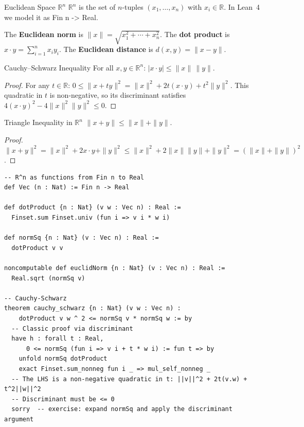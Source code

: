 \documentclass[12pt, openany]{book}
\theoremstyle{plain}
\theoremstyle{definition}
\theoremstyle{remark}
\newcommand{\R}{\mathbb{R}}
\newcommand{\li}[1]{{\ttfamily\small\color{tealaccent}#1}}
\begin{document}
\begin{defbox}{Euclidean Space $\R^n$}
$\R^n$ is the set of $n$-tuples $(x_1, \ldots, x_n)$ with $x_i \in \R$. In Lean~4 we model it as \li{Fin n -> Real}.

The \textbf{Euclidean norm} is $\|x\| = \sqrt{x_1^2 + \cdots + x_n^2}$.
The \textbf{dot product} is $x \cdot y = \sum_{i=1}^n x_i y_i$.
The \textbf{Euclidean distance} is $d(x, y) = \|x - y\|$.
\end{defbox}
\color{black}

\begin{thmbox}{Cauchy--Schwarz Inequality}
For all $x, y \in \R^n$: $|x \cdot y| \leq \|x\|\,\|y\|$.
\end{thmbox}
\color{black}

\begin{proof}
For any $t \in \R$: $0 \leq \|x + ty\|^2 = \|x\|^2 + 2t(x \cdot y) + t^2\|y\|^2$. This quadratic in $t$ is non-negative, so its discriminant satisfies $4(x \cdot y)^2 - 4\|x\|^2\|y\|^2 \leq 0$.
\end{proof}

\begin{thmbox}{Triangle Inequality in $\R^n$}
$\|x + y\| \leq \|x\| + \|y\|$.
\end{thmbox}
\color{black}

\begin{proof}
$\|x+y\|^2 = \|x\|^2 + 2x \cdot y + \|y\|^2 \leq \|x\|^2 + 2\|x\|\|y\| + \|y\|^2 = (\|x\| + \|y\|)^2$.
\end{proof}

\begin{leanbox}
\begin{lstlisting}
-- R^n as functions from Fin n to Real
def Vec (n : Nat) := Fin n -> Real

def dotProduct {n : Nat} (v w : Vec n) : Real :=
  Finset.sum Finset.univ (fun i => v i * w i)

def normSq {n : Nat} (v : Vec n) : Real :=
  dotProduct v v

noncomputable def euclidNorm {n : Nat} (v : Vec n) : Real :=
  Real.sqrt (normSq v)

-- Cauchy-Schwarz
theorem cauchy_schwarz {n : Nat} (v w : Vec n) :
    dotProduct v w ^ 2 <= normSq v * normSq w := by
  -- Classic proof via discriminant
  have h : forall t : Real,
      0 <= normSq (fun i => v i + t * w i) := fun t => by
    unfold normSq dotProduct
    exact Finset.sum_nonneg fun i _ => mul_self_nonneg _
  -- The LHS is a non-negative quadratic in t: ||v||^2 + 2t(v.w) + t^2||w||^2
  -- Discriminant must be <= 0
  sorry  -- exercise: expand normSq and apply the discriminant argument
\end{lstlisting}
\end{leanbox}
\color{black}
\end{document}
